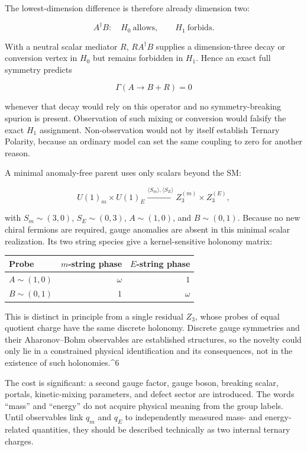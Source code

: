 \documentclass[
]{article}
\begin{document}
The lowest-dimension difference is therefore already dimension two:

\[
A^\dagger B:\quad H_0\ \text{allows},\qquad H_1\ \text{forbids}.
\]

With a neutral scalar mediator \(R\), \(RA^\dagger B\) supplies a
dimension-three decay or conversion vertex in \(H_0\) but remains
forbidden in \(H_1\). Hence an exact full symmetry predicts

\[
\Gamma(A\to B+R)=0
\]

whenever that decay would rely on this operator and no symmetry-breaking
spurion is present. Observation of such mixing or conversion would
falsify the exact \(H_1\) assignment. Non-observation would not by
itself establish Ternary Polarity, because an ordinary model can set the
same coupling to zero for another reason.

A minimal anomaly-free parent uses only scalars beyond the SM:

\[
U(1)_m\times U(1)_E
\xrightarrow{\langle S_m\rangle,\langle S_E\rangle}
Z_3^{(m)}\times Z_3^{(E)},
\]

with \(S_m\sim(3,0)\), \(S_E\sim(0,3)\), \(A\sim(1,0)\), and
\(B\sim(0,1)\). Because no new chiral fermions are required, gauge
anomalies are absent in this minimal scalar realization. Its two string
species give a kernel-sensitive holonomy matrix:

\begin{longtable}[]{@{}lrr@{}}
\toprule\noalign{}
Probe & \(m\)-string phase & \(E\)-string phase \\
\midrule\noalign{}
\endhead
\bottomrule\noalign{}
\endlastfoot
\(A\sim(1,0)\) & \(\omega\) & \(1\) \\
\(B\sim(0,1)\) & \(1\) & \(\omega\) \\
\end{longtable}

This is distinct in principle from a single residual \(Z_3\), whose
probes of equal quotient charge have the same discrete holonomy.
Discrete gauge symmetries and their Aharonov--Bohm observables are
established structures, so the novelty could only lie in a constrained
physical identification and its consequences, not in the existence of
such holonomies.\^{}6

The cost is significant: a second gauge factor, gauge boson, breaking
scalar, portals, kinetic-mixing parameters, and defect sector are
introduced. The words ``mass'' and ``energy'' do not acquire physical
meaning from the group labels. Until observables link \(q_m\) and
\(q_E\) to independently measured mass- and energy-related quantities,
they should be described technically as two internal ternary charges.
\end{document}
